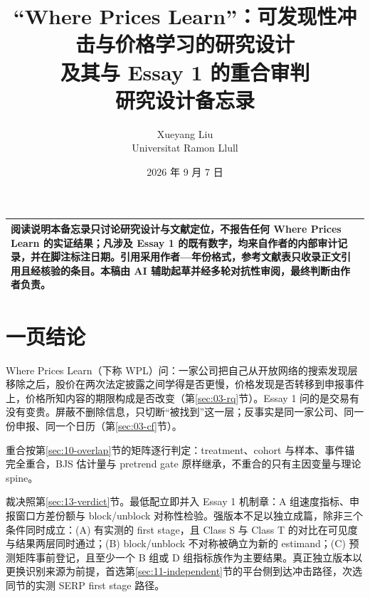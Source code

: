 \documentclass[a4paper,11pt]{ctexart}
\title{\textbf{“Where Prices Learn”：可发现性冲击与价格学习的研究设计\\及其与 Essay 1 的重合审判}\\[0.6em]\large 研究设计备忘录}
\author{Xueyang Liu\\\small Universitat Ramon Llull}
\date{2026 年 9 月 7 日}
\begin{document}
\maketitle
\begin{center}\small
\begin{tabular}{p{}}
\toprule
\textbf{阅读说明}\quad 本备忘录只讨论研究设计与文献定位，不报告任何 Where Prices Learn 的实证结果；凡涉及 Essay 1 的既有数字，均来自作者的内部审计记录，并在脚注标注日期。引用采用作者—年份格式，参考文献表只收录正文引用且经核验的条目。本稿由 AI 辅助起草并经多轮对抗性审阅，最终判断由作者负责。\\
\bottomrule
\end{tabular}
\end{center}
\newpage
\tableofcontents
\newpage
\section{一页结论}\label{sec:01-summary}

Where Prices Learn（下称 WPL）问：一家公司把自己从开放网络的搜索发现层移除之后，股价在两次法定披露之间学得是否更慢，价格发现是否转移到申报事件上，价格所知内容的期限构成是否改变（第\ref{sec:03-rq}节）。Essay 1 问的是交易有没有变贵。屏蔽不删除信息，只切断“被找到”这一层；反事实是同一家公司、同一份申报、同一个日历（第\ref{sec:03-cf}节）。

重合按第\ref{sec:10-overlap}节的矩阵逐行判定：treatment、cohort 与样本、事件锚完全重合，BJS 估计量与 pretrend gate 原样继承，不重合的只有主因变量与理论 spine\citep{davilaparlatore2021,dugastfoucault2018,grossmanstiglitz1980}。

裁决照第\ref{sec:13-verdict}节。最低配立即并入 Essay 1 机制章：A 组速度指标、申报窗口方差份额与 block/unblock 对称性检验。强版本不足以独立成篇，除非三个条件同时成立：(A) 有实测的 first stage，且 Class S 与 Class T 的对比在可见度与结果两层同时通过；(B) block/unblock 不对称被确立为新的 estimand；(C) 预测矩阵事前登记，且至少一个 B 组或 D 组指标族作为主要结果。真正独立版本以更换识别来源为前提，首选第\ref{sec:11-independent}节的平台侧到达冲击路径，次选同节的实测 SERP first stage 路径。
\end{document}
